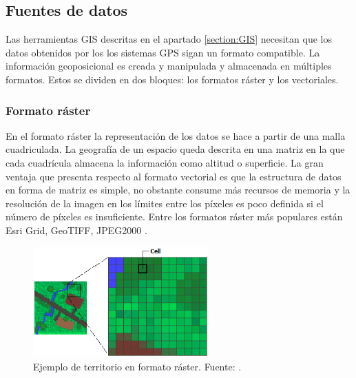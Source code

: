 \subsection{Fuentes de datos}
Las herramientas \ac{GIS} descritas en el apartado \ref{section:GIS} necesitan que los datos obtenidos por los 
los sistemas \ac{GPS} sigan un formato compatible. La información geoposicional es creada y manipulada y 
almacenada en múltiples formatos. Estos se dividen en dos bloques: los formatos ráster y los vectoriales. 

\subsubsection{Formato ráster}
En el formato ráster la representación de los datos se hace a partir de una malla cuadriculada. 
La geografía de un espacio queda descrita en una matriz en la que cada cuadrícula almacena la 
información como altitud o superficie. La gran ventaja que presenta respecto al formato vectorial es que 
la estructura de datos en forma de matriz es simple, no obstante consume más recursos de memoria y la 
resolución de la imagen en los límites entre los píxeles es poco definida si el número de píxeles es insuficiente.
Entre los formatos ráster más populares están Esri Grid, GeoTIFF, JPEG2000 \cite{Morales01}.

\begin{figure}[htb]
\begin{center}
\includegraphics[width=0.6\textwidth]{./Imagenes/RasterImage.png}
\caption{Ejemplo de territorio en formato ráster. Fuente: \cite{ArgGis01}.}
\label{fig:PointGeneration02}
\end{center}
\end{figure}

